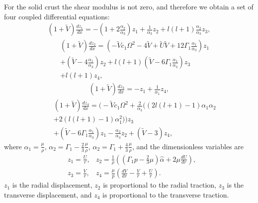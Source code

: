 \documentclass[fleqn,usenatbib]{mnras}
\begin{document}
\hspace{\parindent}For the solid crust the shear modulus is not zero, and therefore we obtain a set of four coupled differential equations:
\begin{align}
\left(1+\tilde{V}\right)\frac{dz_1}{dx}=-\left(1+2\frac{\alpha_2}{\alpha_3}\right)z_1+\frac{1}{\alpha_3}z_2+l\left(l+1\right)\frac{\alpha_2}{\alpha_3}z_3,
\label{eq:z1dr}
\end{align}
\begin{align}\nonumber
&&\left(1+\tilde{V}\right)\frac{dz_2}{dx}=\left(-\tilde{V}c_1\Omega^2-4\tilde{V}+\tilde{U}\tilde{V}+12\Gamma_1\frac{\alpha_1}{\alpha_3}\right)z_1\\\nonumber
&&+\left(\tilde{V}-4\frac{\alpha_1}{\alpha_3}\right)z_2+l\left(l+1\right)\left(\tilde{V}-6\Gamma_1\frac{\alpha_1}{\alpha_3}\right)z_3\\
&&+l\left(l+1\right)z_4,
\label{eq:z2dr}
\end{align}
\begin{align}
\left(1+\tilde{V}\right)\frac{dz_3}{dx}=-z_1+\frac{1}{\alpha_1}z_4,
\label{eq:z3dr}
\end{align}
\begin{align}\nonumber
&&\left(1+\tilde{V}\right)\frac{dz_4}{dx}= \biggr(-\tilde{V}c_1\Omega^2+\frac{2}{\alpha_3}\biggr((2l(l+1)-1)\alpha_1\alpha_2\\\nonumber
&&+2(l(l+1)-1)\alpha_1^2\biggr)\biggr)z_3\\
&&+\left(\tilde{V}-6\Gamma_1\frac{\alpha_1}{\alpha_3}\right)z_1-\frac{\alpha_2}{\alpha_3}z_2+(\tilde{V}-3)z_4,
\label{eq:z4dr}
\end{align}
\noindent where $\alpha_1=\frac{\mu}{\rho}$, $\alpha_2=\Gamma_1-\frac{2}{3}\frac{\mu}{\rho}$, $\alpha_2=\Gamma_1+\frac{4}{3}\frac{\mu}{\rho}$, and the dimensionless variables are 
\begin{align}
&z_1=\frac{U}{r},&z_2=\frac{1}{\rho}\left((\Gamma_1p-\frac{2}{3}\mu)\hat{\alpha}+2\mu\frac{dU}{dr}\right),\\
&z_3=\frac{V}{r},&z_4=\frac{\mu}{p}\left(\frac{dV}{dr}-\frac{V}{r}+\frac{U}{r}\right).
\label{eq:z1z2z3z4}
\end{align}
\noindent $z_1$ is the radial displacement, $z_2$ is proportional to the radial traction, $z_3$ is the transverse displacement, and $z_4$ is proportional to the transverse traction.
\end{document}
